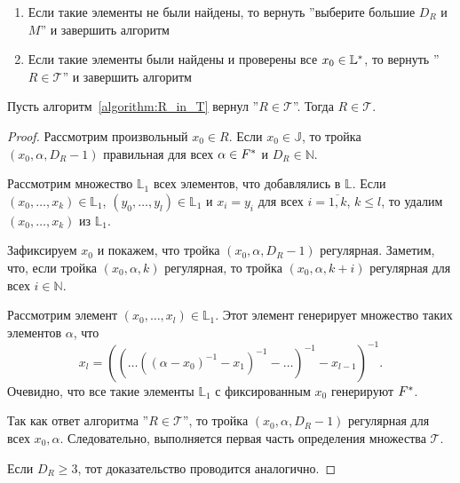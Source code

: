 \documentclass[_00_dissertation.tex]{subfiles}
\begin{document}
\begin{algorithm}
\begin{enumerate}
\begin{enumerate}
            \item Если такие элементы не были найдены, то вернуть ''выберите большие $D_R$ и $M$'' и завершить алгоритм
            
            \item Если такие элементы были найдены и проверены все $x_0 \in \mathbb{L}^{*}$, то вернуть ''$R \in \mathcal{T}$'' и завершить алгоритм
        \end{enumerate}
    \end{enumerate}
\end{algorithm}

\begin{lemma}
    Пусть алгоритм~\ref{algorithm:R_in_T} вернул ''$R \in \mathcal{T}$''.
    Тогда $R \in \mathcal{T}$.
\end{lemma}
\begin{proof}
    Рассмотрим произвольный $x_0 \in R$.
    Если $x_0 \in \mathbb{J}$, то тройка $(x_0, \alpha, D_R - 1)$ правильная для всех $\alpha \in F^{*}$ и $D_R \in \mathbb{N}$.

    Рассмотрим множество $\mathbb{L}_1$ всех элементов, что добавлялись в $\mathbb{L}$.
    Если $(x_0, \ldots, x_k) \in \mathbb{L}_1$, $(y_0, \ldots, y_l) \in \mathbb{L}_1$ и $x_i = y_i$ для всех $i = \overline{1,k}$, $k \le l$, то удалим $(x_0, \ldots, x_k)$ из $\mathbb{L}_1$.

    Зафиксируем $x_0$ и покажем, что тройка $(x_0, \alpha, D_R - 1)$ регулярная.
    Заметим, что, если тройка $(x_0, \alpha, k)$ регулярная, то тройка $(x_0, \alpha, k + i)$ регулярная для всех $i \in \mathbb{N}$.

    Рассмотрим элемент $(x_0, \ldots, x_l) \in \mathbb{L}_1$.
    Этот элемент генерирует множество таких элементов $\alpha$, что
    \begin{equation*}
        x_l = \left(
            \left(
                \ldots \left(
                    \left(
                        \alpha - x_0
                    \right)^{-1} - x_1
                \right)^{-1} - \ldots
            \right)^{-1} - x_{l-1}
        \right)^{-1}.
    \end{equation*}
    Очевидно, что все такие элементы $\mathbb{L}_1$ с фиксированным $x_0$ генерируют $F^{*}$.
    
    Так как ответ алгоритма ''$R \in \mathcal{T}$'', то тройка $(x_0, \alpha, D_R - 1)$ регулярная для всех $x_0, \alpha$.
    Следовательно, выполняется первая часть определения множества $\mathcal{T}$.
    
    Если $D_R \ge 3$, тот доказательство проводится аналогично.
\end{proof}
\end{document}
